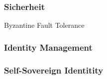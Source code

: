     
    \begin{figure}[H]
    \end{figure}
    
    \subsubsection{Sicherheit}
    \label{sec:sota_blockchain_security}
    Byzantine Fault Tolerance
    
    \subsubsection{Identity Management}
    \label{sec:sota_blockchain_identitymgmnt}
    \subsubsection{Self-Sovereign Identitity}
    \label{sec:sota_blockchain_sovreign}




